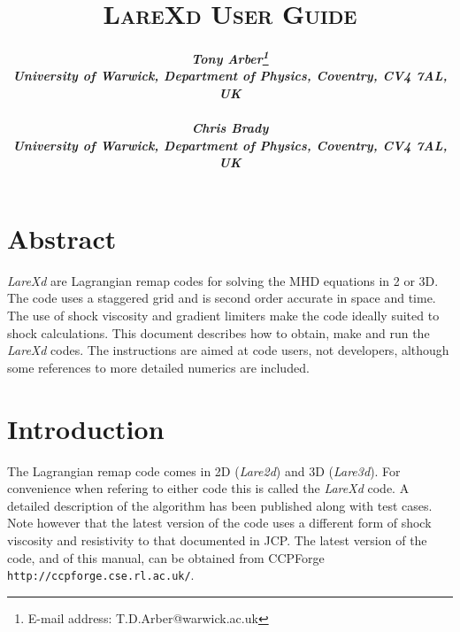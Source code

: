 \documentclass[11pt]{article}
\begin{document}
\title{
\bfseries\scshape LareXd User Guide}
\author{\bfseries\itshape Tony Arber\thanks{E-mail address: T.D.Arber@warwick.ac.uk}\\
University of Warwick, Department of Physics, Coventry, CV4 7AL, UK\\ \\
\bfseries\itshape Chris Brady\\
University of Warwick, Department of Physics, Coventry, CV4 7AL, UK}
\date{}
\maketitle

\thispagestyle{empty}

\section*{Abstract}
{\it LareXd} are Lagrangian remap codes for solving the MHD equations in 2 or 3D. The code uses a staggered grid and is second order accurate in space and time. The use of shock viscosity and gradient limiters make the code ideally suited to shock calculations. This document describes how to obtain, make and run the {\it LareXd}  codes. The instructions are aimed at code users, not developers, although some references to more detailed numerics are included.


\section{Introduction}
The Lagrangian remap code comes in 2D ({\it Lare2d}) and 3D ({\it Lare3d}). For convenience when refering to either code this is called the {\it LareXd} code. A detailed description of the algorithm has been published \cite{jcp} along with test cases. Note however that the latest version of the code uses a different form of shock viscosity and resistivity to that documented in JCP. The latest version of the code, and of this manual, can be obtained from CCPForge {\tt http://ccpforge.cse.rl.ac.uk/}. 
\end{document}
